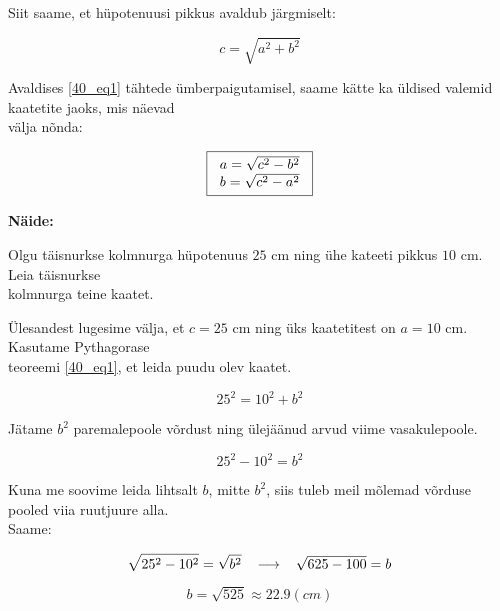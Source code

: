 \begin{center}
{{{\begin{flushleft}
\hspace{5mm}
Siit saame, et hüpotenuusi pikkus avaldub järgmiselt:

\begin{equation}
\label{40_eq2}
\boxed{c=\sqrt{a^{2}+b^{2}}}
\end{equation}

\hspace{5mm}
Avaldises \ref{40_eq1} tähtede ümberpaigutamisel, saame kätte ka üldised valemid kaatetite jaoks, mis näevad\\ \hspace{5mm} välja nõnda:

\begin{equation}
\label{40_eq3}
\boxed{
\begin{tabular}{l}
$a=\sqrt{c^{2}-b^{2}}$\\
$b=\sqrt{c^{2}-a^{2}}$
\end{tabular}
}
\end{equation}

\vspace{2mm}
\hspace{5mm}
\textbf{Näide:}

\vspace{2mm}
\hspace{5mm}
Olgu täisnurkse kolmnurga hüpotenuus $25$ cm ning ühe kateeti pikkus $10$ cm. Leia täisnurkse\\ \hspace{5mm} kolmnurga teine kaatet.

\vspace{2mm}
\hspace{5mm}
Ülesandest lugesime välja, et $c=25$ cm ning üks kaatetitest on $a=10$ cm. Kasutame Pythagorase\\ \hspace{5mm} teoreemi \ref{40_eq1}, et leida puudu olev kaatet.

\vspace{2mm}
\hspace{5mm}
\[ 25^{2} = 10^{2}+b^{2} \]

\vspace{2mm}
\hspace{5mm}
Jätame $b^{2}$ paremalepoole võrdust ning ülejäänud arvud viime vasakulepoole.

\[ 25^{2}-10^{2}=b^{2}\]

\vspace{2mm}
\hspace{5mm}
Kuna me soovime leida lihtsalt $b$, mitte $b^{2}$, siis tuleb meil mõlemad võrduse pooled viia ruutjuure alla.\\ \hspace{5mm} Saame:

\[ \sqrt{25^{2}-10^{2}}=\sqrt{b^{2}} \hspace{3mm} \longrightarrow \hspace{3mm} \sqrt{625-100}=b\]

\[b=\sqrt{525} \approx 22.9 (cm) \]
\end{flushleft}
}}}
\end{center}

